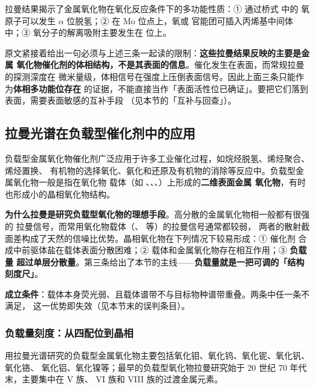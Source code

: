 拉曼结果揭示了金属氧化物在氧化反应条件下的多功能性质：① 通过桥式  中的
氧原子可以发生 $\alpha$ 位脱氢；② 在 Mo 位点上，氧或  官能团可插入丙烯基中间体
中；③ 氧分子的解离吸附主要发生在  位上。

\begin{pitfall}
原文紧接着给出一句必须与上述三条一起读的限制：\textbf{这些拉曼结果反映的主要是金属
氧化物催化剂的体相结构，不是其表面的信息}。催化发生在表面，而常规拉曼的探测深度在
微米量级，体相信号在强度上压倒表面信号。因此上面三条只能作为\textbf{体相多功能位存在}
的证据，不能直接当作「表面活性位已确证」。要把它们落到表面，需要表面敏感的互补手段
（见本节的「互补与回查」）。
\end{pitfall}

\subsection{拉曼光谱在负载型催化剂中的应用}

负载型金属氧化物催化剂广泛应用于许多工业催化过程，如烷烃脱氢、烯烃聚合、烯烃置换、
有机物的选择氧化、氨化和还原及有机物的消除等反应中。负载型金属氧化物一般是指在氧化物
载体（如 、、、）上形成的\textbf{二维表面金属
氧化物}，有时也形成小的晶相氧化物结构。

\begin{principle}
\textbf{为什么拉曼是研究负载型氧化物的理想手段}。高分散的金属氧化物相一般都有很强的
拉曼信号，而常用氧化物载体（、 等）的拉曼信号通常都较弱，
两者的散射截面差构成了天然的信噪比优势。晶相氧化物在下列情况下较易形成：① 催化剂
合成中前驱体盐在载体表面分散困难；② 载体和金属氧化物存在相互作用；③ \textbf{负载量
超过单层分散量}。第三条给出了本节的主线——\textbf{负载量就是一把可调的「结构刻度尺」}。

\textbf{成立条件}：载体本身荧光弱、且载体谱带不与目标物种谱带重叠。两条中任一条不满足，
这一优势即失效（见本节末的误判条目）。
\end{principle}

\subsubsection{负载量刻度：从四配位到晶相}

用拉曼光谱研究的负载型金属氧化物主要包括氧化钼、氧化钨、氧化铌、氧化钒、氧化铬、
氧化铝、氧化镍等；最早的负载型氧化物拉曼研究始于 20 世纪 70 年代末，主要集中在 V 族、
VI 族和 VIII 族的过渡金属元素。

